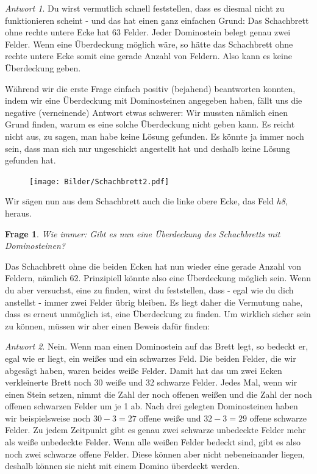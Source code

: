 \documentclass[a4paper,ngerman,12pt]{scrartcl}
\theoremstyle{definition}
\theoremstyle{plain}
\newtheorem{frage}[defn]{Frage}
\theoremstyle{remark}
\newtheorem*{antwort}{Antwort}
\begin{document}
\begin{antwort}
	Du wirst vermutlich schnell feststellen, dass es diesmal nicht zu funktionieren scheint - und das hat einen ganz einfachen Grund: Das Schachbrett ohne rechte untere Ecke hat 63 Felder. Jeder Dominostein belegt genau zwei Felder. Wenn eine Überdeckung möglich wäre, so hätte das Schachbrett ohne rechte untere Ecke somit eine gerade Anzahl von Feldern. Also kann es keine Überdeckung geben.
\end{antwort}

Während wir die erste Frage einfach positiv (bejahend) beantworten konnten, indem wir eine Überdeckung mit Dominosteinen angegeben haben, fällt uns die negative (verneinende) Antwort etwas schwerer: Wir mussten nämlich einen Grund finden, warum es eine solche Überdeckung nicht geben kann. Es reicht nicht aus, zu sagen, man habe keine Lösung gefunden. Es könnte ja immer noch sein, dass man sich nur ungeschickt angestellt hat und deshalb keine Lösung gefunden hat.

\begin{figure}\vspace{-20pt}
	\texttt{[image: Bilder/Schachbrett2.pdf]}
	\vspace{-40pt}\end{figure}

Wir sägen nun aus dem Schachbrett auch die linke obere Ecke, das Feld \emph{h8}, heraus.

\begin{frage}
	Wie immer: Gibt es nun eine Überdeckung des Schachbretts mit Dominosteinen?
\end{frage}

Das Schachbrett ohne die beiden Ecken hat nun wieder eine gerade Anzahl von Feldern, nämlich 62. Prinzipiell könnte also eine Überdeckung möglich sein. Wenn du aber versuchst, eine zu finden, wirst du feststellen, dass - egal wie du dich anstellst - immer zwei Felder übrig bleiben. Es liegt daher die Vermutung nahe, dass es erneut unmöglich ist, eine Überdeckung zu finden. Um wirklich sicher sein zu können, müssen wir aber einen Beweis dafür finden: 

\begin{antwort}
	Nein. Wenn man einen Dominostein auf das Brett legt, so bedeckt er, egal wie er liegt, ein weißes und ein schwarzes Feld. Die beiden Felder, die wir abgesägt haben, waren beides weiße Felder. Damit hat das um zwei Ecken verkleinerte Brett noch 30 weiße und 32 schwarze Felder. Jedes Mal, wenn wir einen Stein setzen, nimmt die Zahl der noch offenen weißen und die Zahl der noch offenen schwarzen Felder um je 1 ab. Nach drei gelegten Dominosteinen haben wir beispielsweise noch $30-3=27$ offene weiße und $32-3=29$ offene schwarze Felder. Zu jedem Zeitpunkt gibt es genau zwei schwarze unbedeckte Felder mehr als weiße unbedeckte Felder. Wenn alle weißen Felder bedeckt sind, gibt es also noch zwei schwarze offene Felder. Diese können aber nicht nebeneinander liegen, deshalb können sie nicht mit einem Domino überdeckt werden.
\end{antwort}
\end{document}
